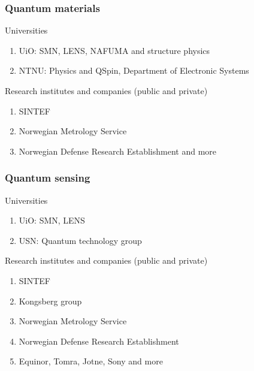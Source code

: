 \documentclass{beamer}
\begin{document}
\begin{frame}
\frametitle{Quantum materials}

\begin{block}{Universities }
\begin{enumerate}
\item UiO: SMN, LENS, NAFUMA and structure physics

\item NTNU: Physics and QSpin, Department of Electronic Systems
\end{enumerate}

\noindent
\end{block}

\begin{block}{Research institutes and companies (public and private) }
\begin{enumerate}
\item SINTEF

\item Norwegian Metrology Service

\item Norwegian Defense Research Establishment and more
\end{enumerate}

\noindent
\end{block}
\end{frame}

\begin{frame}
\frametitle{Quantum sensing}

\begin{block}{Universities }
\begin{enumerate}
\item UiO: SMN, LENS

\item USN: Quantum technology group
\end{enumerate}

\noindent
\end{block}

\begin{block}{Research institutes and companies (public and private) }
\begin{enumerate}
\item SINTEF

\item Kongsberg group

\item Norwegian Metrology Service

\item Norwegian Defense Research Establishment

\item Equinor, Tomra, Jotne, Sony and more
\end{enumerate}

\noindent
\end{block}
\end{frame}
\end{document}
